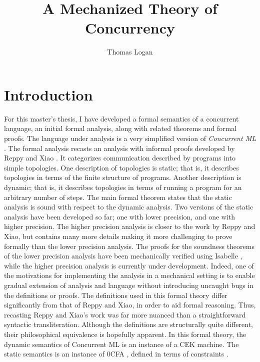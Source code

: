 \documentclass[10pt]{article}
\title{A Mechanized Theory of Concurrency}
\author{Thomas Logan}
\begin{document}
\maketitle
{}

\newpage
{}


\section{Introduction}
For this master's thesis, I have developed a formal semantics of
a concurrent language, an initial formal analysis, along with related theorems and formal 
proofs. The language under analysis is
a very simplified version of \textit{Concurrent ML} \cite{concurrent_ml}. The formal analysis
recasts an analysis with informal proofs developed by Reppy and Xiao \cite{specialization}. It
categorizes communication described by programs into simple topologies. One description of
topologies is static; that is, it describes topologies in terms of the finite structure of
programs.  Another description is dynamic; that is, it describes topologies in terms of running
a program for an arbitrary number of steps. The main formal theorem states that the static
analysis is sound with respect to the dynamic analysis. Two versions of the static analysis
have been developed so far; one with lower precision, and one with higher precision. The higher
precision analysis is closer to the work by Reppy and Xiao, but contains many more details making
it more challenging to prove formally than the lower precision analysis.
The proofs for the soundness theorems of the lower precision analysis
have been mechanically verified using Isabelle \cite{isabelle}, while the higher precision
analysis is currently under development. Indeed, one of the motivations for implementing the analysis 
in a mechanical setting is to enable gradual extension of analysis and language without introducing
uncaught bugs in the definitions or proofs. The definitions used in this formal theory differ
significantly from that of Reppy and Xiao, in order to aid formal reasoning. Thus, recasting
Reppy and Xiao's work was far more nuanced than a straightforward
syntactic transliteration.
Although the definitions are structurally quite different,
their philosophical equivalence is hopefully apparent. 
In this formal theory, the dynamic semantics of Concurrent ML is
an instance of a CEK machine. The static semantics is an instance of 0CFA
\cite{0cfa}, defined in terms of constraints \cite{program_analysis}.
\end{document}
